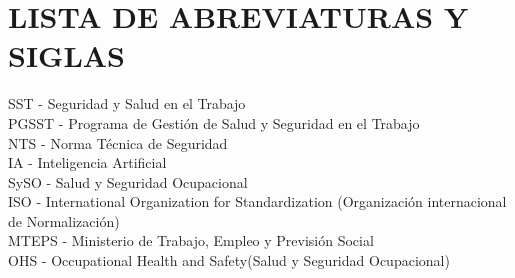 \section*{LISTA DE ABREVIATURAS Y SIGLAS}
\noindent
SST - Seguridad y Salud en el Trabajo\\
PGSST - Programa de Gestión de Salud y Seguridad en el Trabajo \\
NTS - Norma Técnica de Seguridad \\
IA - Inteligencia Artificial \\
SySO - Salud y Seguridad Ocupacional \\
ISO - International Organization for Standardization (Organización internacional de Normalización) \\
MTEPS - Ministerio de Trabajo, Empleo y Previsión Social\\
OHS - Occupational Health and Safety(Salud y Seguridad Ocupacional)\\